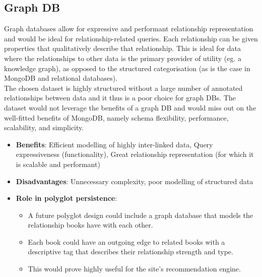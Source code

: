 \documentclass[11pt]{article}
\begin{document}
\subsection{Graph DB}
\label{sec:orgfca63e9}
Graph databases allow for expressive and performant relationship representation and would be ideal for relationship-related queries. Each relationship can be given properties that qualitatively describe that relationship. This is ideal for data where the relationships to other data is the primary provider of utility (eg. a knowledge graph), as opposed to the structured categorisation (as is the case in MongoDB and relational databases).\\
\linebreak
The chosen dataset is highly structured without a large number of annotated relationships between data and it thus is a poor choice for graph DBs. The dataset would not leverage the benefits of a graph DB and would miss out on the well-fitted benefits of MongoDB, namely schema flexibility, performance, scalability, and simplicity.

\begin{itemize}
\item \textbf{Benefits}: Efficient modelling of highly inter-linked data, Query expressiveness (functionality), Great relationship representation (for which it is scalable and performant)
\item \textbf{Disadvantages}: Unnecessary complexity, poor modelling of structured data
\item \textbf{Role in polyglot persistence}:
\begin{itemize}
\item A future polyglot design could include a graph database that models the relationship books have with each other.
\item Each book could have an outgoing edge to related books with a descriptive tag that describes their relationship strength and type.
\item This would prove highly useful for the site's recommendation engine.
\end{itemize}
\end{itemize}
\end{document}
